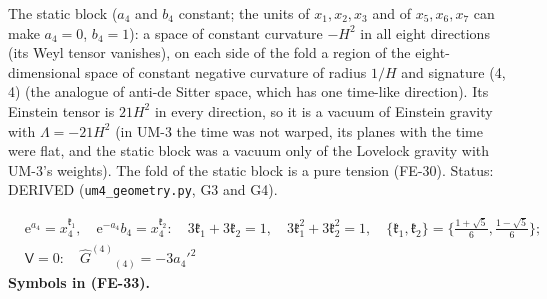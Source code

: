 \documentclass[
  10pt,
]{article}
\begin{document}
The static block (\(a_4\) and \(b_4\) constant; the units of
\(x_1, x_2, x_3\) and of \(x_5, x_6, x_7\) can make \(a_4 = 0\),
\(b_4 = 1\)): a space of constant curvature \(-H^2\) in all eight
directions (its Weyl tensor vanishes), on each side of the fold a region
of the eight-dimensional space of constant negative curvature of radius
\(1/H\) and signature (4, 4) (the analogue of anti-de Sitter space,
which has one time-like direction). Its Einstein tensor is \(21H^2\) in
every direction, so it is a vacuum of Einstein gravity with
\(\Lambda = -21H^2\) (in UM-3 the time was not warped, its planes with
the time were flat, and the static block was a vacuum only of the
Lovelock gravity with UM-3's weights). The fold of the static block is a
pure tension (FE-30). Status: DERIVED (\texttt{um4\_geometry.py}, G3 and
G4).

\[
\begin{aligned}
&\mathrm{e}^{a_4} = x_4^{\mathfrak{k}_1},\quad \mathrm{e}^{-a_4}b_4 = x_4^{\mathfrak{k}_2}:\quad
 3\mathfrak{k}_1 + 3\mathfrak{k}_2 = 1,\quad 3\mathfrak{k}_1^2 + 3\mathfrak{k}_2^2 = 1,\quad
 \{\mathfrak{k}_1, \mathfrak{k}_2\} = \Big\{\frac{1 + \sqrt5}{6}, \frac{1 - \sqrt5}{6}\Big\};\\
&\mathsf{V} = 0:\quad \hat G^{(4)}{}_{(4)} = -3a_4'^2
\end{aligned} \tag{FE-33}
\] \textbf{Symbols in (FE-33).}
\end{document}
